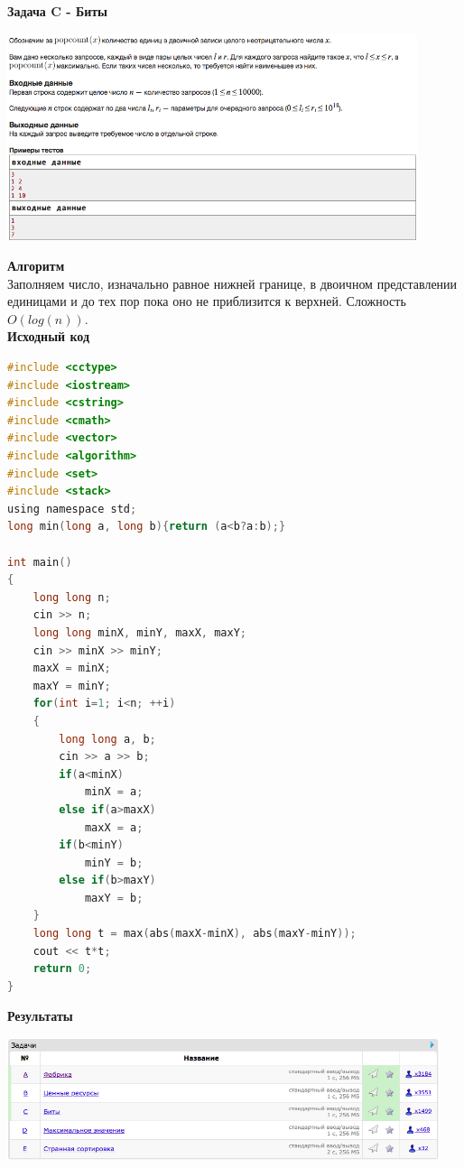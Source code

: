 \documentclass[a4paper,12pt]{article}
\begin{document}
\newpage
\textbf{{\large Задача C - Биты}} \\
\begin{center}
\includegraphics[width=0.9\textwidth]{C_276/C_276_C.png}\\ [1cm]
\end{center}
\textbf{{\large Алгоритм}} \\
Заполняем число, изначально равное нижней границе, в двоичном представлении единицами и до тех пор пока оно не приблизится к верхней. Сложность $O(log(n))$.\\

\textbf{{\large Исходный код}}
\begin{lstlisting}[language=C]
#include <cctype>
#include <iostream>
#include <cstring>
#include <cmath>
#include <vector>
#include <algorithm>
#include <set>
#include <stack>
using namespace std;
long min(long a, long b){return (a<b?a:b);}

int main()
{
    long long n;
    cin >> n;
    long long minX, minY, maxX, maxY;
    cin >> minX >> minY;
    maxX = minX;
    maxY = minY;
    for(int i=1; i<n; ++i)
    {
        long long a, b;
        cin >> a >> b;
        if(a<minX)
            minX = a;
        else if(a>maxX)
            maxX = a;
        if(b<minY)
            minY = b;
        else if(b>maxY)
            maxY = b;
    }
    long long t = max(abs(maxX-minX), abs(maxY-minY));
    cout << t*t;
    return 0;
}
\end{lstlisting}

\textbf{{\large Результаты}} \\
\begin{center}
\includegraphics[width=0.95\textwidth]{C_276/A_C_276_result.png}\\ [1cm]
\end{center}
\end{document}
